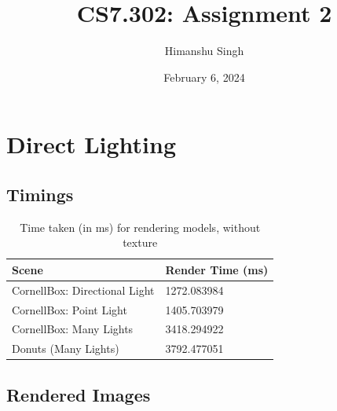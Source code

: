 \documentclass[a4paper]{myarticle}
\title{CS7.302: Assignment 2}
\author{Himanshu Singh}
\date{February 6, 2024}
\begin{document}
\maketitle

\section{Direct Lighting}

\subsection{Timings}

\begin{table}[H]
\centering
\renewcommand{\arraystretch}{1.5}
\begin{tabularx}{\linewidth}{LL}
\hline
Scene & Render Time (ms) \\
\hline
CornellBox: Directional Light & 1272.083984 \\
CornellBox: Point Light & 1405.703979 \\
CornellBox: Many Lights & 3418.294922 \\
Donuts (Many Lights) & 3792.477051 \\
\hline
\end{tabularx}
\caption{Time taken (in ms) for rendering models, without texture}
\end{table}

\subsection{Rendered Images}
\end{document}
